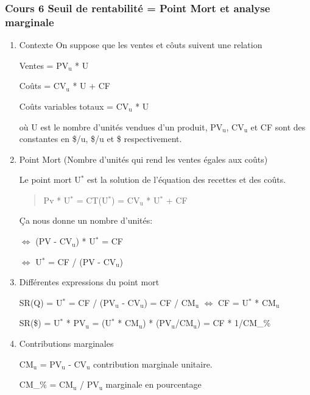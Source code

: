 \documentclass[11pt]{article}
\begin{document}
\subsubsection{Cours 6 Seuil de rentabilité = Point Mort et analyse marginale}
\label{sec:org7fa4ad1}
\begin{enumerate}
\item Contexte
\label{sec:orgd34c9d3}
On suppose que les ventes et côuts suivent une relation

Ventes = PV\(_{\text{u}}\) * U

Coûts = CV\(_{\text{u}}\) * U + CF

Coûts variables totaux = CV\(_{\text{u}}\) * U

où U est le nombre d'unités vendues d'un produit, PV\(_{\text{u}}\), CV\(_{\text{u}}\) et CF sont des
constantes en \$/u, \$/u et \$ respectivement.

\item Point Mort (Nombre d'unités qui rend les ventes égales aux coûts)
\label{sec:org3e67ff8}

Le point mort U\(^{\text{*}}\) est la solution de l'équation des recettes et des coûts.

\begin{quote}
Pv * U\(^{\text{*}}\) = CT(U\(^{\text{*}}\)) = CV\(_{\text{u}}\) * U\(^{\text{*}}\) + CF
\end{quote}

Ça nous donne un nombre d'unités:

\(\Leftrightarrow\) (PV - CV\(_{\text{u}}\)) * U\(^{\text{*}}\) = CF

\(\Leftrightarrow\) U\(^{\text{*}}\) = CF / (PV - CV\(_{\text{u}}\))

\item Différentes expressions du point mort
\label{sec:org97fd66d}

SR(Q) = U\(^{\text{*}}\) = CF / (PV\(_{\text{u}}\) - CV\(_{\text{u}}\)) = CF / CM\(_{\text{u}}\) \(\Leftrightarrow\) CF = U\(^{\text{*}}\) * CM\(_{\text{u}}\)

SR(\$) = U\(^{\text{*}}\) * PV\(_{\text{u}}\) = (U\(^{\text{*}}\) * CM\(_{\text{u}}\)) * (PV\(_{\text{u}}\)/CM\(_{\text{u}}\)) = CF * 1/CM\_\%

\item Contributions marginales
\label{sec:org93db10a}

CM\(_{\text{u}}\) = PV\(_{\text{u}}\) - CV\(_{\text{u}}\) contribution marginale unitaire.

CM\_\% = CM\(_{\text{u}}\) / PV\(_{\text{u}}\) marginale en pourcentage


\end{enumerate}
\end{document}
